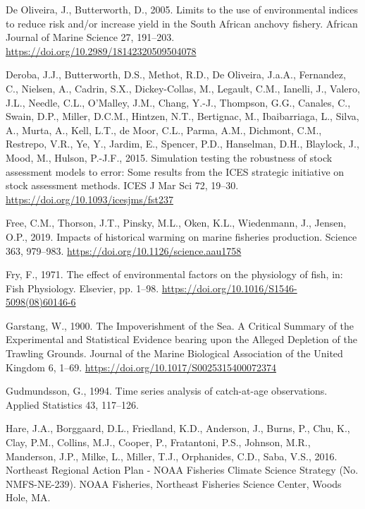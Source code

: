 \documentclass[]{article}
\begin{document}
\leavevmode\hypertarget{ref-deoliveira2005Limits}{}%
De Oliveira, J., Butterworth, D., 2005. Limits to the use of
environmental indices to reduce risk and/or increase yield in the South
African anchovy fishery. African Journal of Marine Science 27, 191--203.
\url{https://doi.org/10.2989/18142320509504078}

\leavevmode\hypertarget{ref-deroba2015Simulation}{}%
Deroba, J.J., Butterworth, D.S., Methot, R.D., De Oliveira, J.a.A.,
Fernandez, C., Nielsen, A., Cadrin, S.X., Dickey-Collas, M., Legault,
C.M., Ianelli, J., Valero, J.L., Needle, C.L., O'Malley, J.M., Chang,
Y.-J., Thompson, G.G., Canales, C., Swain, D.P., Miller, D.C.M.,
Hintzen, N.T., Bertignac, M., Ibaibarriaga, L., Silva, A., Murta, A.,
Kell, L.T., de Moor, C.L., Parma, A.M., Dichmont, C.M., Restrepo, V.R.,
Ye, Y., Jardim, E., Spencer, P.D., Hanselman, D.H., Blaylock, J., Mood,
M., Hulson, P.-J.F., 2015. Simulation testing the robustness of stock
assessment models to error: Some results from the ICES strategic
initiative on stock assessment methods. ICES J Mar Sci 72, 19--30.
\url{https://doi.org/10.1093/icesjms/fst237}

\leavevmode\hypertarget{ref-free2019Impacts}{}%
Free, C.M., Thorson, J.T., Pinsky, M.L., Oken, K.L., Wiedenmann, J.,
Jensen, O.P., 2019. Impacts of historical warming on marine fisheries
production. Science 363, 979--983.
\url{https://doi.org/10.1126/science.aau1758}

\leavevmode\hypertarget{ref-fry1971Effect}{}%
Fry, F., 1971. The effect of environmental factors on the physiology of
fish, in: Fish Physiology. Elsevier, pp. 1--98.
\url{https://doi.org/10.1016/S1546-5098(08)60146-6}

\leavevmode\hypertarget{ref-garstang1900Impoverishment}{}%
Garstang, W., 1900. The Impoverishment of the Sea. A Critical Summary of
the Experimental and Statistical Evidence bearing upon the Alleged
Depletion of the Trawling Grounds. Journal of the Marine Biological
Association of the United Kingdom 6, 1--69.
\url{https://doi.org/10.1017/S0025315400072374}

\leavevmode\hypertarget{ref-gudmundsson1994Time}{}%
Gudmundsson, G., 1994. Time series analysis of catch-at-age
observations. Applied Statistics 43, 117--126.

\leavevmode\hypertarget{ref-hare2016Northeast}{}%
Hare, J.A., Borggaard, D.L., Friedland, K.D., Anderson, J., Burns, P.,
Chu, K., Clay, P.M., Collins, M.J., Cooper, P., Fratantoni, P.S.,
Johnson, M.R., Manderson, J.P., Milke, L., Miller, T.J., Orphanides,
C.D., Saba, V.S., 2016. Northeast Regional Action Plan - NOAA Fisheries
Climate Science Strategy (No. NMFS-NE-239). NOAA Fisheries, Northeast
Fisheries Science Center, Woods Hole, MA.
\end{document}

